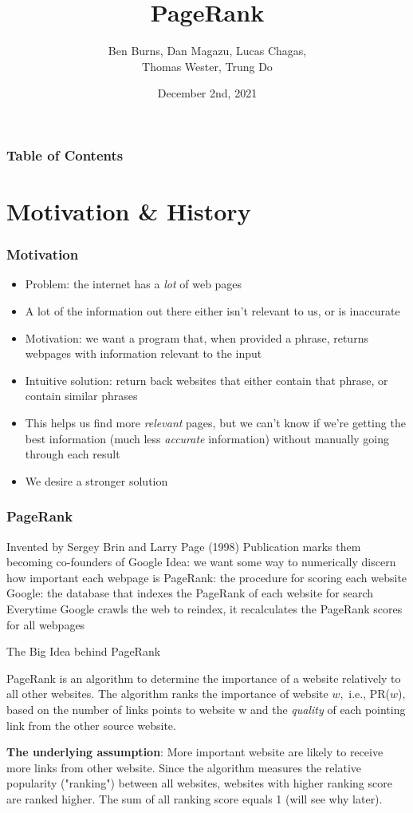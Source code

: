 \documentclass{beamer}
\title{PageRank}
\author{Ben Burns, Dan Magazu, Lucas Chagas, \\Thomas Wester, Trung Do}
\date{December 2nd, 2021}
\begin{document}
\frame{\titlepage}

\begin{frame}
\frametitle{Table of Contents}
\tableofcontents
\end{frame}


\section{Motivation \& History}
\begin{frame}[t]
\frametitle{Motivation}
\begin{itemize}
    \setlength\itemsep{0.5em}
    \item Problem: the internet has a \emph{lot} of web pages
    \item A lot of the information out there either isn't relevant to us, or is inaccurate
    \item Motivation: we want a program that, when provided a phrase, returns webpages with information relevant to the input
    \item Intuitive solution: return back websites that either contain that phrase, or contain similar phrases
    \item This helps us find more \emph{relevant} pages, but we can't know if we're getting the best information (much less \emph{accurate} information) without manually going through each result
    \item We desire a stronger solution
\end{itemize}
\end{frame}

\begin{frame}[t]
\frametitle{PageRank}
\begin{outline}
    \1 Invented by Sergey Brin and Larry Page (1998)\footnotemark 
        \2 Publication marks them becoming co-founders of Google  
    \1 Idea: we want some way to numerically discern how important each webpage is
    \1 PageRank: the procedure for scoring each website
    \1 Google: the database that indexes the PageRank of each website for search
    \1 Everytime Google crawls the web to reindex, it recalculates the PageRank scores for all webpages
\end{outline}
\end{frame}

\begin{frame}[t]{The Big Idea behind PageRank}
\begin{outline}
    \1 PageRank is an algorithm to determine the importance of a website relatively to all other websites. The algorithm ranks the importance of website $w,$ i.e., PR($w$), based on the number of links points to website w and the \emph{quality} of each pointing link from the other source website. 

    \1 \textbf{The underlying assumption}: More important website are likely to receive more links from other website. Since the algorithm measures the relative popularity ("ranking") between all websites, websites with higher ranking score are ranked higher. The sum of all ranking score equals 1 (will see why later).
\end{outline}
\end{frame}
\end{document}
